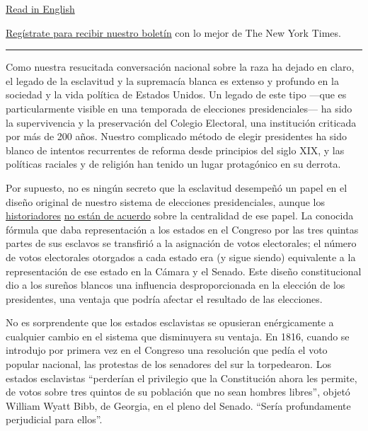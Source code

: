 \href{https://www.nytimes3xbfgragh.onion/2020/08/03/opinion/electoral-college-racism-white-supremacy.html}{Read
in English}

\href{https://www.nytimes3xbfgragh.onion/newsletters/el-times}{Regístrate
para recibir nuestro boletín} con lo mejor de The New York Times.

\begin{center}\rule{0.5\linewidth}{\linethickness}\end{center}

Como nuestra resucitada conversación nacional sobre la raza ha dejado en
claro, el legado de la esclavitud y la supremacía blanca es extenso y
profundo en la sociedad y la vida política de Estados Unidos. Un legado
de este tipo ---que es particularmente visible en una temporada de
elecciones presidenciales--- ha sido la supervivencia y la preservación
del Colegio Electoral, una institución criticada por más de 200 años.
Nuestro complicado método de elegir presidentes ha sido blanco de
intentos recurrentes de reforma desde principios del siglo XIX, y las
políticas raciales y de religión han tenido un lugar protagónico en su
derrota.

Por supuesto, no es ningún secreto que la esclavitud desempeñó un papel
en el diseño original de nuestro sistema de elecciones presidenciales,
aunque los
\href{https://www.nytimes3xbfgragh.onion/2019/04/04/opinion/the-electoral-college-slavery-myth.html?action=click\&module=RelatedLinks\&pgtype=Article}{historiadores}
\href{https://www.nytimes3xbfgragh.onion/2019/04/06/opinion/electoral-college-slavery.html}{no
están de acuerdo} sobre la centralidad de ese papel. La conocida fórmula
que daba representación a los estados en el Congreso por las tres
quintas partes de sus esclavos se transfirió a la asignación de votos
electorales; el número de votos electorales otorgados a cada estado era
(y sigue siendo) equivalente a la representación de ese estado en la
Cámara y el Senado. Este diseño constitucional dio a los sureños blancos
una influencia desproporcionada en la elección de los presidentes, una
ventaja que podría afectar el resultado de las elecciones.

No es sorprendente que los estados esclavistas se opusieran
enérgicamente a cualquier cambio en el sistema que disminuyera su
ventaja. En 1816, cuando se introdujo por primera vez en el Congreso una
resolución que pedía el voto popular nacional, las protestas de los
senadores del sur la torpedearon. Los estados esclavistas ``perderían el
privilegio que la Constitución ahora les permite, de votos sobre tres
quintos de su población que no sean hombres libres'', objetó William
Wyatt Bibb, de Georgia, en el pleno del Senado. ``Sería profundamente
perjudicial para ellos''.

